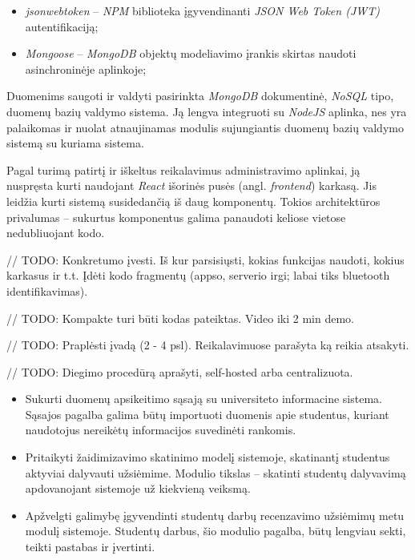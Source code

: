 \documentclass{VUMIFPSbakalaurinis}
\begin{document}
\begin{itemize}
    \item \textit{jsonwebtoken} – \textit{NPM} biblioteka įgyvendinanti \textit{JSON Web Token (JWT)} autentifikaciją;
    \item \textit{Mongoose} – \textit{MongoDB} objektų modeliavimo įrankis skirtas naudoti asinchroninėje aplinkoje;
\end{itemize}

Duomenims saugoti ir valdyti pasirinkta \textit{MongoDB} dokumentinė, \textit{NoSQL} tipo, duomenų bazių valdymo sistema. Ją lengva integruoti su \textit{NodeJS} aplinka, nes yra palaikomas ir nuolat atnaujinamas modulis sujungiantis duomenų bazių valdymo sistemą su kuriama sistema.

Pagal turimą patirtį ir iškeltus reikalavimus administravimo aplinkai, ją nuspręsta kurti naudojant \textit{React} išorinės pusės (angl. \textit{frontend}) karkasą. Jis leidžia kurti sistemą susidedančią iš daug komponentų. Tokios architektūros privalumas – sukurtus komponentus galima panaudoti keliose vietose nedubliuojant kodo.

// TODO: Konkretumo įvesti. Iš kur parsisiųsti, kokias funkcijas naudoti, kokius karkasus ir t.t. Įdėti kodo fragmentų (appso, serverio irgi; labai tiks bluetooth identifikavimas). 

// TODO: Kompakte turi būti kodas pateiktas. Video iki 2 min demo.

// TODO: Praplėsti įvadą (2 - 4 psl). Reikalavimuose parašyta ką reikia atsakyti.

// TODO: Diegimo procedūrą aprašyti, self-hosted arba centralizuota.


\begin{itemize}
	\item Sukurti duomenų apsikeitimo sąsają su universiteto informacine sistema. Sąsajos pagalba galima būtų importuoti duomenis apie studentus, kuriant naudotojus nereikėtų informacijos suvedinėti rankomis.
	\item Pritaikyti žaidimizavimo skatinimo modelį sistemoje, skatinantį studentus aktyviai dalyvauti užsiėmime. Modulio tikslas – skatinti studentų dalyvavimą apdovanojant sistemoje už kiekvieną veiksmą.
	\item Apžvelgti galimybę įgyvendinti studentų darbų recenzavimo užsiėmimų metu modulį sistemoje. Studentų darbus, šio modulio pagalba, būtų lengviau sekti, teikti pastabas ir įvertinti. 
\end{itemize}
\end{document}
